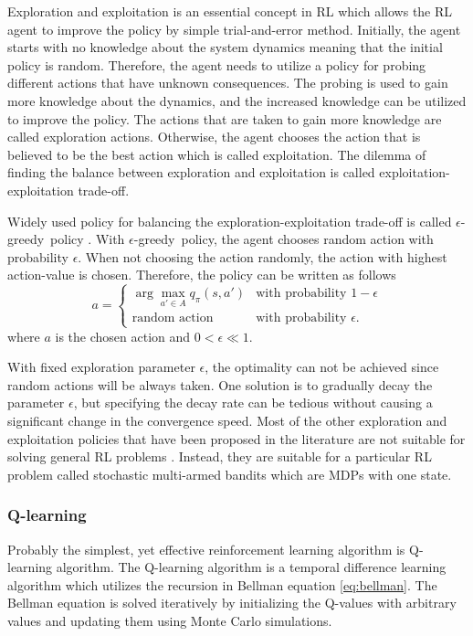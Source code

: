 \documentclass[english, 12pt, a4paper, elec, utf8, a-1b, online]{aaltothesis}
\newcommand{\egreedy}{$\epsilon$-greedy~}
\begin{document}
Exploration and exploitation is an essential concept in RL which allows the RL agent to improve the policy by simple trial-and-error method.
Initially, the agent starts with no knowledge about the system dynamics meaning that the initial policy is random.
Therefore, the agent needs to utilize a policy for probing different actions that have unknown consequences.
The probing is used to gain more knowledge about the dynamics, and the increased knowledge can be utilized to improve the policy.
The actions that are taken to gain more knowledge are called exploration actions.
Otherwise, the agent chooses the action that is believed to be the best action which is called exploitation.
The dilemma of finding the balance between exploration and exploitation is called exploitation-exploitation trade-off.

Widely used policy for balancing the exploration-exploitation trade-off is called \egreedy policy \cite{Sutton2018}.
With \egreedy policy, the agent chooses random action with probability $\epsilon$.
When not choosing the action randomly, the action with highest action-value is chosen.
Therefore, the policy can be written as follows
\begin{equation}
    a =
    \left\{
        \begin{array}{ll}
            \arg\max_{a' \in A} q_\pi(s, a') & \text{with probability $1-\epsilon$}\\
            \text{random action} & \text{with probability $\epsilon$}.
        \end{array}
    \right.
\end{equation}
where $a$ is the chosen action and $0 < \epsilon \ll 1$.

With fixed exploration parameter $\epsilon$, the optimality can not be achieved since random actions will be always taken.
One solution is to gradually decay the parameter $\epsilon$, but specifying the decay rate can be tedious without causing a significant change in the convergence speed.
Most of the other exploration and exploitation policies that have been proposed in the literature are not suitable for solving general RL problems \cite{Slivkins2019}.
Instead, they are suitable for a particular RL problem called stochastic multi-armed bandits which are MDPs with one state.

\subsubsection{Q-learning}

Probably the simplest, yet effective reinforcement learning algorithm is Q-learning algorithm.
The Q-learning algorithm is a temporal difference learning algorithm which utilizes the recursion in Bellman equation \eqref{eq:bellman}.
The Bellman equation is solved iteratively by initializing the Q-values with arbitrary values and updating them using Monte Carlo simulations.
\end{document}
